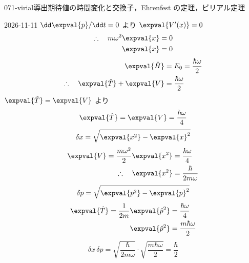 \documentclass[uplatex,dvipdfmx,a4paper,11pt]{jsarticle}
\begin{document}
\begin{mondai}{071-virial}{導出}{期待値の時間変化と交換子，Ehrenfest の定理，ビリアル定理}
\begin{kotaeutsushi}{2026-11-11}
$\dd\expval{p}/\dd t=0$ より $\expval{V'(x)}=0$
\begin{align*}
\therefore\quad m\omega^{2}\expval{x}&=0\\
\expval{x}&=0
\end{align*}
\begin{align*}
\expval{\hat{H}}&=E_{0}=\frac{\hbar\omega}{2}\\
\therefore\quad\expval{\hat{T}}+\expval{V}&=\frac{\hbar\omega}{2}
\end{align*}
$\expval{\hat{T}}=\expval{V}$ より
\[ \expval{\hat{T}}=\expval{V}=\frac{\hbar\omega}{4} \]
\[ \delta x=\sqrt{\expval{x^{2}}-\expval{x}^{2}} \]
\begin{align*}
\expval{V}=\frac{m\omega^{2}}{2}\expval{x^{2}}&=\frac{\hbar\omega}{4}\\
\therefore\quad\expval{x^{2}}&=\frac{\hbar}{2m\omega}
\end{align*}
\[ \delta p=\sqrt{\expval{p^{2}}-\expval{p}^{2}} \]
\begin{align*}
\expval{\hat{T}}=\frac{1}{2m}\expval{\hat{p}^{2}}&=\frac{\hbar\omega}{4}\\
\expval{\hat{p}^{2}}&=\frac{m\hbar\omega}{2}
\end{align*}
\[ \delta x\,\delta p=\sqrt{\frac{\hbar}{2m\omega}}\cdot\sqrt{\frac{m\hbar\omega}{2}}=\frac{\hbar}{2} \]
\end{kotaeutsushi}
\end{mondai}

\noteowari
\end{document}
